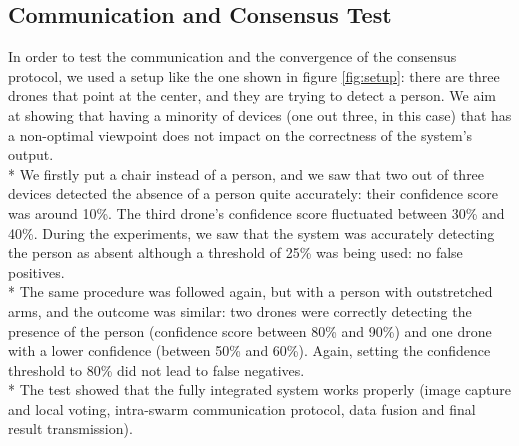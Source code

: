 \documentclass[10pt,conference,compsocconf]{IEEEtran}
\begin{document}
\begin{enumerate}
\subsection{Communication and Consensus Test}
In order to test the communication and the convergence of the consensus protocol, we used a setup like the one shown in figure \ref{fig:setup}: there are three drones that point at the center, and they are trying to detect a person. We aim at showing that having a minority of devices (one out three, in this case) that has a non-optimal viewpoint does not impact on the correctness of the system's output.\\*
We firstly put a chair instead of a person, and we saw that two out of three devices detected the absence of a person quite accurately: their confidence score was around 10\%. The third drone's confidence score fluctuated between 30\% and 40\%. During the experiments, we saw that the system was accurately detecting the person as absent although a threshold of 25\% was being used: no false positives.\\*
The same procedure was followed again, but with a person with outstretched arms, and the outcome was similar: two drones were correctly detecting the presence of the person (confidence score between 80\% and 90\%) and one drone with a lower confidence (between 50\% and 60\%). Again, setting the confidence threshold to 80\% did not lead to false negatives.\\*
The test showed that the fully integrated system works properly (image capture and local voting, intra-swarm communication protocol, data fusion and final result transmission).

\end{enumerate}
\end{document}
